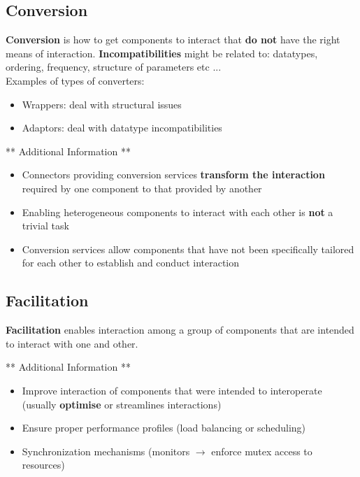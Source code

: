 \documentclass[a4paper]{article}
\begin{document}
\subsection{Conversion}
\textbf{Conversion} is how to get components to interact that \textbf{do not} have the right means of interaction. \textbf{Incompatibilities} might be related to: datatypes, ordering, frequency, structure of parameters etc ...\\

Examples of types of converters:
\begin{itemize}
\item Wrappers: deal with structural issues
\item Adaptors: deal with datatype incompatibilities\\
\end{itemize}

** Additional Information **
\begin{itemize}
\item Connectors providing conversion services \textbf{transform the interaction} required by one component to that provided by another
\item Enabling heterogeneous components to interact with each other is \textbf{not} a trivial task
\item Conversion services allow components that have not been specifically tailored for each other to establish and conduct interaction
\end{itemize}

\subsection{Facilitation}
\textbf{Facilitation} enables interaction among a group of components that are intended to interact with one and other.

** Additional Information ** 
\begin{itemize}
\item Improve interaction of components that were intended to interoperate (usually \textbf{optimise} or streamlines interactions)
\item Ensure proper performance profiles (load balancing or scheduling)
\item Synchronization mechanisms (monitors $\rightarrow$ enforce mutex access to resources)
\end{itemize}
\end{document}
